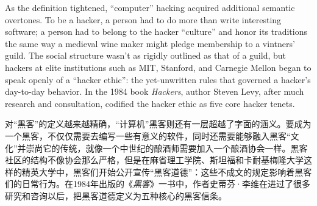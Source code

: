 \ifdefined\eng
As the definition tightened, ``computer'' hacking acquired additional semantic overtones. To be a hacker, a person had to do more than write interesting software; a person had to belong to the hacker ``culture'' and honor its traditions the same way a medieval wine maker might pledge membership to a vintners' guild. The social structure wasn't as rigidly outlined as that of a guild, but hackers at elite institutions such as MIT, Stanford, and Carnegie Mellon began to speak openly of a ``hacker ethic'': the yet-unwritten rules that governed a hacker's day-to-day behavior. In the 1984 book \textit{Hackers}, author Steven Levy, after much research and consultation, codified the hacker ethic as five core hacker tenets.
\fi

\ifdefined\chs
对“黑客”的定义越来越精确，“计算机”黑客则还有一层超越了字面的涵义。要成为一个黑客，不仅仅需要去编写一些有意义的软件，同时还需要能够融入黑客“文化”并崇尚它的传统，就像一个中世纪的酿酒师需要加入一个酿酒协会一样。黑客社区的结构不像协会那么严格，但是在麻省理工学院、斯坦福和卡耐基梅隆大学这样的精英大学中，黑客们开始公开宣传“黑客道德”：这些不成文的规定影响着黑客们的日常行为。在1984年出版的《\textit{黑客}》一书中，作者史蒂芬·李维在进过了很多研究和咨询以后，把黑客道德定义为五种核心的黑客信条。
\fi


